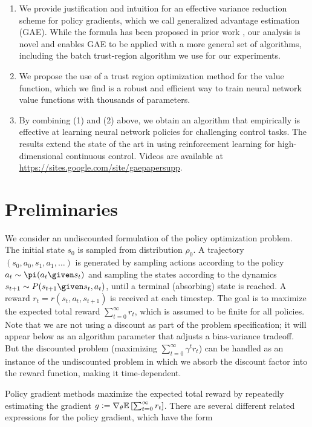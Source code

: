 \begin{enumerate}[leftmargin=*]
\item We provide justification and intuition for an effective variance reduction scheme for policy gradients, which we call generalized advantage estimation (GAE). While the formula has been proposed in prior work \citep{kimura1998analysis,wawrzynski2009real}, our analysis is novel and enables GAE to be applied with a more general set of algorithms, including the batch trust-region algorithm we use for our experiments.
\item We propose the use of a trust region optimization method for the value function, which we find is a robust and efficient way to train neural network value functions with thousands of parameters.
\item By combining (1) and (2) above, we obtain an algorithm that empirically is effective at learning neural network policies for challenging control tasks. The results extend the state of the art in using reinforcement learning for high-dimensional continuous control. Videos are available at \url{https://sites.google.com/site/gaepapersupp}.
\end{enumerate}

\section{Preliminaries}
\label{sec:prelim}

We consider an undiscounted formulation of the policy optimization problem. The initial state  $s_0$ is sampled from distribution $\rho_0$.
A trajectory $(s_0, a_0, s_1, a_1, \dots)$ is generated by sampling actions according to the policy $a_t \sim \pi(a_t \given s_t)$ and sampling the states according to the dynamics $s_{t+1} \sim P(s_{t+1} \given s_t, a_t)$, until a terminal (absorbing) state is reached. A reward $r_t = r(s_t,a_t,s_{t+1})$ is received at each timestep. The goal is to maximize the expected total reward $\sum_{t=0}^{\infty} r_t$, which is assumed to be finite for all policies. Note that we are not using a discount as part of the problem specification; it will appear below as an algorithm parameter that adjusts a bias-variance tradeoff. But the discounted problem (maximizing $\sum_{t=0}^{\infty} \gamma^t r_t$) can be handled as an instance of the undiscounted problem in which we absorb the discount factor into the reward function, making it time-dependent.

Policy gradient methods maximize the expected total reward by repeatedly estimating the gradient $g \vcentcolon= \nabla_{\theta} \mathbb{E}\left[\sum_{t=0}^{\infty} r_t\right]$.
There are several different related expressions for the policy gradient, which have the form

